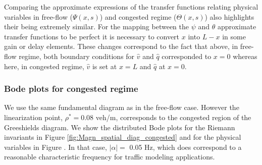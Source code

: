 \documentclass[preprint]{elsarticle}
\begin{document}
Comparing the approximate expressions of the transfer functions relating physical variables in free-flow ($\Psi\left(x,s\right)$) and congested regime ($\Theta\left(x,s\right)$) also highlights their being extremely similar. For the mapping between the $\psi$ and $\theta$ approximate transfer functions to be perfect it is necessary to convert $x$ into $L-x$ in some gain or delay elements. These changes correspond to the fact that above, in free-flow regime, both boundary conditions for $\hat{v}$ and $\hat{q}$ corresponded to $x=0$ whereas here, in congested regime, $\hat{v}$ is set at $x=L$ and $\hat{q}$ at $x=0$.

\subsubsection{Bode plots for congested regime}
We use the same fundamental diagram as in the free-flow case. However the linearization point, $\rho^* = 0.08$ veh/m, corresponds to the congested region of the Greeshields diagram. We show the distributed Bode plots for the Riemann invariants in Figure \ref{fig:Magn_spatial_diag_congested} and for the physical variables in Figure . In that case, $\left|\alpha\right| =$ 0.05 Hz, which does correspond to a reasonable characteristic frequency for traffic modeling applications.

\end{document}

